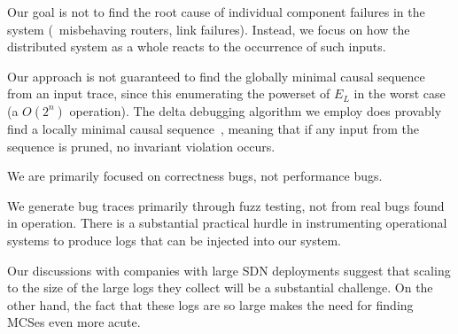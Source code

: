 

 Our goal is not to find the root
cause of individual component failures in the system (\eg~misbehaving routers,
link failures). Instead, we focus on
how the distributed system as a whole reacts to the occurrence of such inputs.

Our approach is not guaranteed to find the globally minimal
causal sequence from an input trace, since this enumerating the powerset of
$E_L$ in the worst case (a $O(2^n)$ operation).
The delta debugging algorithm we employ does provably find a
locally minimal causal sequence~\cite{Zeller:1999:YMP:318773.318946},
meaning that if any input from the sequence is pruned, no invariant violation
occurs.

We are primarily focused on correctness bugs, not performance bugs.

We generate bug traces primarily through fuzz testing, not from real bugs
found in operation. There is a substantial practical hurdle in instrumenting
operational systems to produce logs that can be injected into our system. %

Our discussions with companies with large SDN deployments suggest that scaling to the size of the
large logs they collect will be a substantial challenge.
On the other hand, the fact that these logs are so large makes the need for finding MCSes even more acute.


